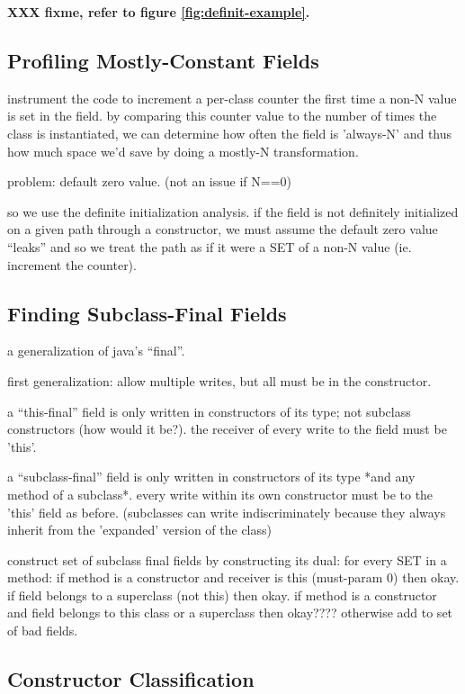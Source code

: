 \documentclass[preprint]{acmconf}
\begin{document}
{\bf XXX fixme, refer to figure \ref{fig:definit-example}.}

\subsection{Profiling Mostly-Constant Fields}
instrument the code to increment a per-class counter the first time a
non-N value is set in the field.  by comparing this counter value to
the number of times the class is instantiated, we can determine how
often the field is 'always-N' and thus how much space we'd save by
doing a mostly-N transformation.

problem: default zero value. (not an issue if N==0)

so we use the definite initialization analysis.  if the field is
not definitely initialized on a given path through a constructor,
we must assume the default zero value ``leaks'' and so we treat
the path as if it were a SET of a non-N value (ie. increment the
counter).

\subsection{Finding Subclass-Final Fields}
a generalization of java's ``final''.

first generalization: allow multiple writes, but all must be in the
constructor.

a ``this-final'' field is only written in constructors of its type;
not subclass constructors (how would it be?).  the receiver of every
write to the field must be 'this'.

a ``subclass-final'' field is only written in constructors of its type
*and any method of a subclass*.  every write within its own
constructor must be to the 'this' field as before.  (subclasses
can write indiscriminately because they always inherit from the 'expanded'
version of the class)

construct set of subclass final fields by constructing its dual:
for every SET in a method: if method is a constructor and receiver
is this (must-param 0) then okay.  if field belongs to a superclass
(not this) then okay.  if method is a constructor and field belongs
to this class or a superclass then okay????  otherwise add to set
of bad fields.

\subsection{Constructor Classification}
\end{document}
